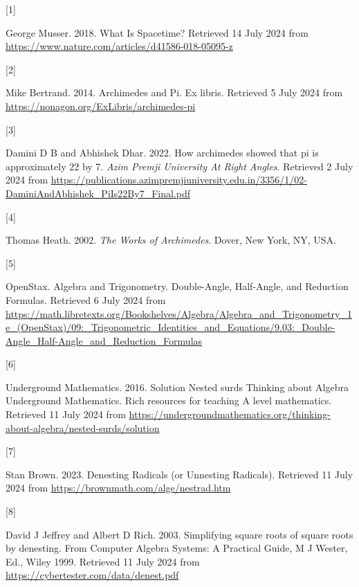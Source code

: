 \documentclass[
  a4paper,
]{article}
\newlength{\cslhangindent}
\newlength{\csllabelwidth}
\newenvironment{CSLReferences}[2] %
 {\begin{list}{}{%
  \setlength{\itemindent}{0pt}
  \setlength{\leftmargin}{0pt}
  \setlength{\parsep}{0pt}
  \ifodd #1
   \setlength{\leftmargin}{\cslhangindent}
   \setlength{\itemindent}{-1\cslhangindent}
  \fi
  \setlength{\itemsep}{#2\baselineskip}}}
 {\end{list}}
\newcommand{\CSLLeftMargin}[1]{\parbox[t]{\csllabelwidth}{\strut#1\strut}}
\newcommand{\CSLRightInline}[1]{\parbox[t]{\linewidth - \csllabelwidth}{\strut#1\strut}}
\begin{document}
\label{refs}
\begin{CSLReferences}{0}{0}
\CSLLeftMargin{{[}1{]} }%
\CSLRightInline{George Musser. 2018. {What Is Spacetime?} Retrieved 14
July 2024 from \url{https://www.nature.com/articles/d41586-018-05095-z}}

\CSLLeftMargin{{[}2{]} }%
\CSLRightInline{Mike Bertrand. 2014. {Archimedes and Pi}. Ex libris.
Retrieved 5 July 2024 from
\url{https://nonagon.org/ExLibris/archimedes-pi}}

\CSLLeftMargin{{[}3{]} }%
\CSLRightInline{Damini D B and Abhishek Dhar. 2022. How archimedes
showed that pi is approximately 22 by 7. \emph{{Azim Premji University
At Right Angles}}. Retrieved 2 July 2024 from
\url{https://publications.azimpremjiuniversity.edu.in/3356/1/02-DaminiAndAbhishek_PiIs22By7_Final.pdf}}

\CSLLeftMargin{{[}4{]} }%
\CSLRightInline{Thomas Heath. 2002. \emph{{The Works of Archimedes}}.
Dover, New York, NY, USA.}

\CSLLeftMargin{{[}5{]} }%
\CSLRightInline{OpenStax. {Algebra and Trigonometry}. {Double-Angle,
Half-Angle, and Reduction Formulas}. Retrieved 6 July 2024 from
\url{https://math.libretexts.org/Bookshelves/Algebra/Algebra_and_Trigonometry_1e_(OpenStax)/09:_Trigonometric_Identities_and_Equations/9.03:_Double-Angle_Half-Angle_and_Reduction_Formulas}}

\CSLLeftMargin{{[}6{]} }%
\CSLRightInline{Underground Mathematics. 2016. {Solution \textbar{}
Nested surds \textbar{} Thinking about Algebra \textbar{} Underground
Mathematics}. {Rich resources for teaching A level mathematics}.
Retrieved 11 July 2024 from
\url{https://undergroundmathematics.org/thinking-about-algebra/nested-surds/solution}}

\CSLLeftMargin{{[}7{]} }%
\CSLRightInline{Stan Brown. 2023. {Denesting Radicals (or Unnesting
Radicals)}. Retrieved 11 July 2024 from
\url{https://brownmath.com/alge/nestrad.htm}}

\CSLLeftMargin{{[}8{]} }%
\CSLRightInline{David J Jeffrey and Albert D Rich. 2003. Simplifying
square roots of square roots by denesting. {From Computer Algebra
Systems: A Practical Guide, M J Wester, Ed., Wiley 1999}. Retrieved 11
July 2024 from \url{https://cybertester.com/data/denest.pdf}}


\end{CSLReferences}
\end{document}
